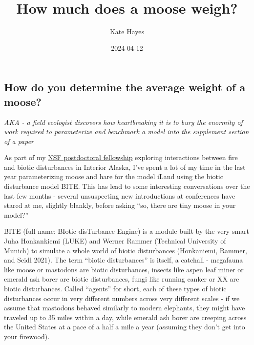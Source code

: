 \documentclass[
  letterpaper,
  DIV=11,
  numbers=noendperiod,
  oneside]{scrartcl}
\title{How much does a moose weigh?}
\author{Kate Hayes}
\date{2024-04-12}
\begin{document}
\maketitle
\hypertarget{how-do-you-determine-the-average-weight-of-a-moose}{%
\subsection{How do you determine the average weight of a
moose?}\label{how-do-you-determine-the-average-weight-of-a-moose}}

\emph{AKA - a field ecologist discovers how heartbreaking it is to bury
the enormity of work required to parameterize and benchmark a model into
the supplement section of a paper}

As part of my
\href{https://www.nsf.gov/awardsearch/showAward?AWD_ID=2219248&HistoricalAwards=false}{NSF
postdoctoral fellowship} exploring interactions between fire and biotic
disturbances in Interior Alaska, I've spent a lot of my time in the last
year parameterizing moose and hare for the model iLand using the biotic
disturbance model BITE. This has lead to some interesting conversations
over the last few months - several unsuspecting new introductions at
conferences have stared at me, slightly blankly, before asking ``so,
there are tiny moose in your model?''

BITE (full name: BIotic disTurbance Engine) is a module built by the
very smart Juha Honkankiemi (LUKE) and Werner Rammer (Technical
University of Munich) to simulate a whole world of biotic disturbances
(Honkaniemi, Rammer, and Seidl
2021).
The term ``biotic disturbances'' is itself, a catchall - megafauna like
moose or mastodons are biotic disturbances, insects like aspen leaf
miner or emerald ash borer are biotic disturbances, fungi like running
canker or XX are biotic disturbances. Called ``agents'' for short, each
of these types of biotic disturbances occur in very different numbers
across very different scales - if we assume that mastodons behaved
similarly to modern elephants, they might have traveled up to 35 miles
within a day, while emerald ash borer are creeping across the United
States at a pace of a half a mile a year (assuming they don't get into
your firewood).
\end{document}
